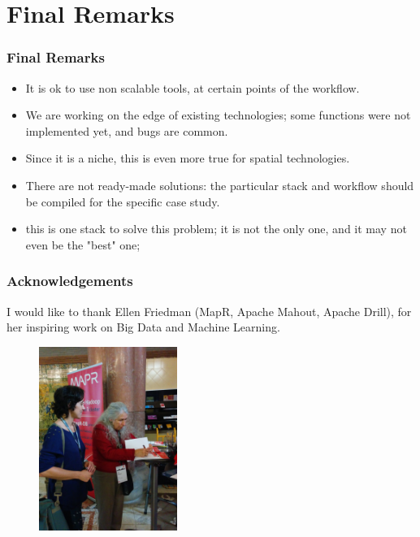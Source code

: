 \documentclass[hyperref={pdfpagelabels=true}]{beamer}
\begin{document}
\section{Final Remarks}
\begin{frame}
\frametitle{Final Remarks}
    \begin{itemize}    
      \item<2->It is ok to use non scalable tools, at certain points of the workflow.
      \item<3->We are working on the edge of existing technologies; some functions were not implemented yet, and bugs are common.
      \item<4->Since it is a niche, this is even more true for spatial technologies.
      \item<5->There are not ready-made solutions: the particular stack and workflow should be compiled for the specific case study.
      \item<6->this is one stack to solve this problem; it is not the only one, and it may not even be the "best" one;%
     \end{itemize}
\end{frame}


\begin{frame}
\frametitle{Acknowledgements}
I would like to thank Ellen Friedman (MapR, Apache Mahout, Apache Drill), for her inspiring work on Big Data and Machine Learning.
    \begin{figure}   
      \includegraphics[width=0.4\textwidth]{ellen2.jpg}      
    \end{figure}   
\end{frame}
\end{document}
